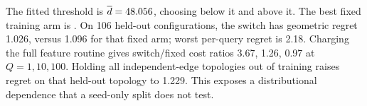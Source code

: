 The fitted threshold is $\overline{d}=48.056$, choosing  below it and  above it. The best fixed training arm is . On 106 held-out configurations, the switch has geometric regret 1.026, versus 1.096 for that fixed arm; worst per-query regret is 2.18. Charging the full feature routine gives switch/fixed cost ratios 3.67, 1.26, 0.97 at $Q=1,10,100$.
Holding all independent-edge topologies out of training raises regret on that held-out topology to 1.229. This exposes a distributional dependence that a seed-only split does not test.
